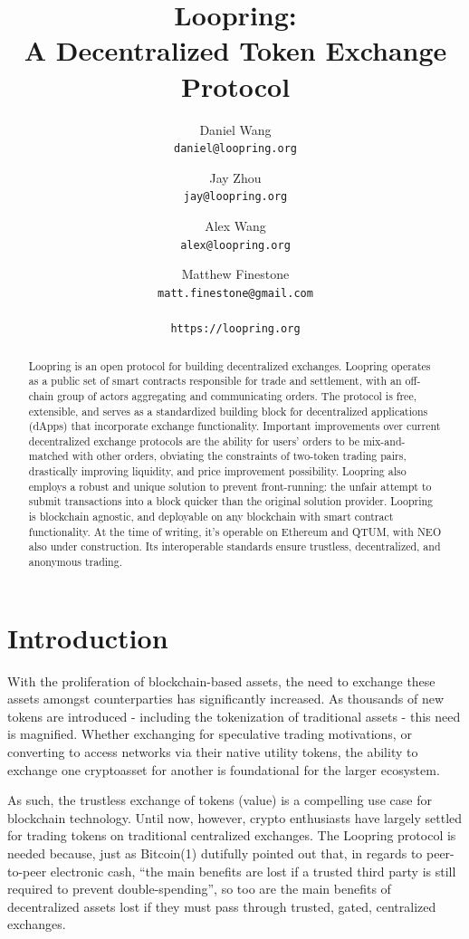 \documentclass[UTF8,nofonts]{article}
\title{\textbf{Loopring:}\\\textbf{A Decentralized Token Exchange Protocol}}
\author{
  Daniel Wang\\
  \texttt{daniel@loopring.org}\\
  \and
  	Jay Zhou\\
  	\texttt{jay@loopring.org}\\
  	\and
  	Alex Wang\\
  	\texttt{alex@loopring.org}\\
  	\and
  	Matthew Finestone\\
  	\texttt{matt.finestone@gmail.com}\\ 
  \\
  \texttt{https://loopring.org}
 }
\begin{document}
\maketitle


\begin{abstract}
Loopring is an open protocol for building decentralized exchanges. Loopring operates as a public set of smart contracts responsible for trade and settlement, with an off-chain group of actors aggregating and communicating orders. The protocol is free, extensible, and serves as a standardized building block for decentralized applications (dApps) that incorporate exchange functionality. Important improvements over current decentralized exchange protocols are the ability for users’ orders to be mix-and-matched with other orders, obviating the constraints of two-token trading pairs, drastically improving liquidity, and price improvement possibility. Loopring also employs a robust and unique solution to prevent front-running: the unfair attempt to submit transactions into a block quicker than the original solution provider. Loopring is blockchain agnostic, and deployable on any blockchain with smart contract functionality. At the time of writing, it’s operable on Ethereum and QTUM, with NEO also under construction. Its interoperable standards ensure trustless, decentralized, and anonymous trading. 
\end{abstract}

\section{Introduction\label{sec:introduction}}

With the proliferation of blockchain-based assets, the need to exchange these assets amongst counterparties has significantly increased. As thousands of new tokens are introduced - including the tokenization of traditional assets - this need is magnified. Whether exchanging for speculative trading motivations, or converting to access networks via their native utility tokens, the ability to exchange one cryptoasset for another is foundational for the larger ecosystem.
 
As such, the trustless exchange of tokens (value) is a compelling use case for blockchain technology. Until now, however, crypto enthusiasts have largely settled for trading tokens on traditional centralized exchanges. The Loopring protocol is needed because, just as Bitcoin(1) dutifully pointed out that, in regards to peer-to-peer electronic cash, “the main benefits are lost if a trusted third party is still required to prevent double-spending”, so too are the main benefits of decentralized assets lost if they must pass through trusted, gated, centralized exchanges.
\end{document}
